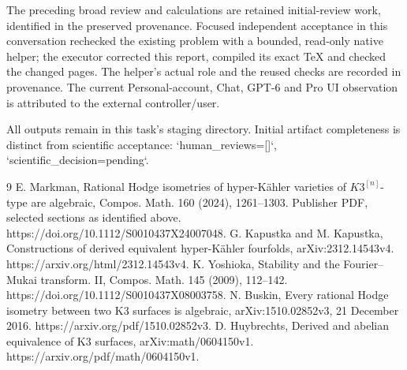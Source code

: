 \documentclass[10pt]{article}
\begin{document}
The preceding broad review and calculations are retained initial-review work, identified in the preserved provenance. Focused independent acceptance in this conversation rechecked the existing problem with a bounded, read-only native helper; the executor corrected this report, compiled its exact TeX and checked the changed pages. The helper’s actual role and the reused checks are recorded in provenance. The current Personal-account, Chat, GPT-6 and Pro UI observation is attributed to the external controller/user.\par
All outputs remain in this task’s staging directory. Initial artifact completeness is distinct from scientific acceptance: `human\_reviews=[]`, `scientific\_decision=pending`.\par
9 E. Markman, Rational Hodge isometries of hyper-Kähler varieties of \(K3^{[n]}\)-type are algebraic, Compos. Math. 160 (2024), 1261–1303. Publisher PDF, selected sections as identified above. https://doi.org/10.1112/S0010437X24007048. G. Kapustka and M. Kapustka, Constructions of derived equivalent hyper-Kähler fourfolds, arXiv:2312.14543v4. https://arxiv.org/html/2312.14543v4. K. Yoshioka, Stability and the Fourier–Mukai transform. II, Compos. Math. 145 (2009), 112–142. https://doi.org/10.1112/S0010437X08003758. N. Buskin, Every rational Hodge isometry between two K3 surfaces is algebraic, arXiv:1510.02852v3, 21 December 2016. https://arxiv.org/pdf/1510.02852v3. D. Huybrechts, Derived and abelian equivalence of K3 surfaces, arXiv:math/0604150v1. https://arxiv.org/pdf/math/0604150v1.\par
\end{document}
